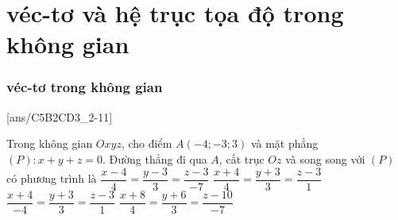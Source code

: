 \part{véc-tơ và hệ trục tọa độ trong không gian}
\section{véc-tơ trong không gian}
[ans/C5B2CD3_2-11]
\TN
\begin{ex}%
	Trong không gian $Oxyz$, cho điểm $A(-4;-3;3)$ và mặt phẳng $(P)\colon x+y+z=0$. Đường thẳng đi qua $A$, cắt trục $Oz$ và song song với $(P)$ có phương trình là
	\choice
	{$\dfrac{x-4}{4}=\dfrac{y-3}{3}=\dfrac{z-3}{-7}$}
	{$\dfrac{x+4}{4}=\dfrac{y+3}{3}=\dfrac{z-3}{1}$}
	{$\dfrac{x+4}{-4}=\dfrac{y+3}{3}=\dfrac{z-3}{1}$}
	{\True $\dfrac{x+8}{4}=\dfrac{y+6}{3}=\dfrac{z-10}{-7}$}
\end{ex}	
